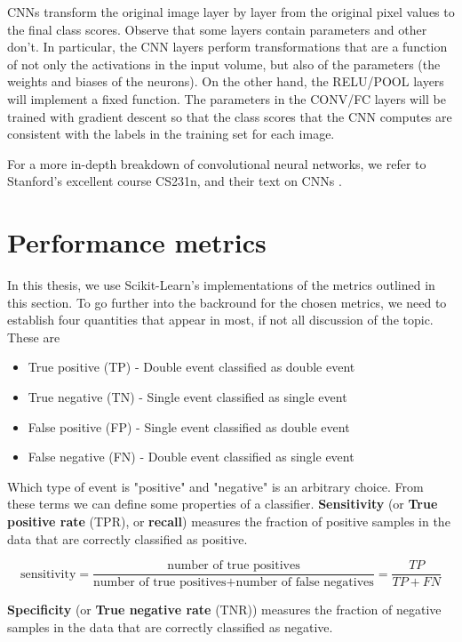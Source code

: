 \noindent CNNs transform the original image layer by layer from the original
pixel values to the final class scores. Observe that some layers contain
parameters and other don’t. In particular, the CNN layers perform
transformations that are a function of not only the activations in the
input volume, but also of the parameters (the weights and biases of
the neurons). On the other hand, the RELU/POOL layers will implement a
fixed function. The parameters in the CONV/FC layers will be trained
with gradient descent so that the class scores that the CNN computes
are consistent with the labels in the training set for each image.

\noindent For a more in-depth breakdown of convolutional neural networks,
we refer to Stanford's excellent course CS231n, and their text on CNNs \cite{cs231n}.

\section{Performance metrics}
In this thesis, we use Scikit-Learn's \cite{PedregosaFABIANPEDREGOSA2011} implementations
of the metrics outlined in this section.
To go further into the backround for the chosen metrics, we need to establish four 
quantities that appear in most, if not all discussion of the topic. These are
\begin{itemize}
	\item True positive (TP) - Double event classified as double event
	\item True negative (TN) - Single event classified as single event
	\item False positive (FP) - Single event classified as double event
	\item False negative (FN) - Double event classified as single event
\end{itemize}
\noindent Which type of event is "positive" and "negative" is an arbitrary choice.
From these terms we can define some properties of a classifier.
\textbf{Sensitivity} (or \textbf{True positive rate} (TPR), or \textbf{recall})
measures the fraction of positive samples in the data that are correctly classified 
as positive.

$$\text{sensitivity} = \frac{\text{number of true positives}}{\text{number of true positives} + \text{number of false negatives}} = \frac{TP}{TP + FN}$$

\noindent \textbf{Specificity} (or \textbf{True negative rate} (TNR)) measures the fraction 
of negative samples in the data that are correctly classified as negative.

